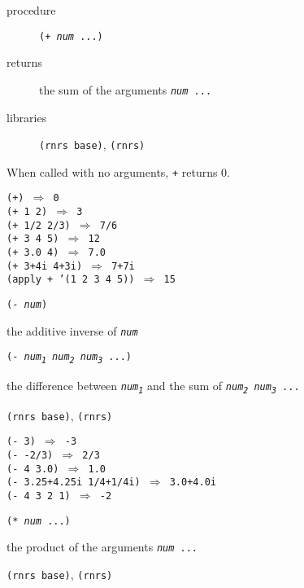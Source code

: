 \begin{description}

\label{objects_s89}\item[procedure] \texttt{(+ \textit{num} ...)}



\item[returns] the sum of the arguments \texttt{\textit{num} ...}


\item[libraries] \texttt{(rnrs base)}, \texttt{(rnrs)}
\end{description}


When called with no arguments, \texttt{+} returns 0.


\begin{alltt}
(+) \(\Rightarrow\) 0
(+ 1 2) \(\Rightarrow\) 3
(+ 1/2 2/3) \(\Rightarrow\) 7/6
(+ 3 4 5) \(\Rightarrow\) 12
(+ 3.0 4) \(\Rightarrow\) 7.0
(+ 3+4i 4+3i) \(\Rightarrow\) 7+7i
(apply + '(1 2 3 4 5)) \(\Rightarrow\) 15
\end{alltt}

\begin{description}

\label{objects_s90}\item[procedure] \texttt{(- \textit{num})}



\item[returns] the additive inverse of \texttt{\textit{num}}


\item[procedure] \texttt{(- \textit{num\textsubscript{1}} \textit{num\textsubscript{2}} \textit{num\textsubscript{3}} ...)}



\item[returns] the difference between \texttt{\textit{num\textsubscript{1}}} and the sum of \texttt{\textit{num\textsubscript{2}} \textit{num\textsubscript{3}} ...}


\item[libraries] \texttt{(rnrs base)}, \texttt{(rnrs)}
\end{description}


\begin{alltt}
(- 3) \(\Rightarrow\) -3
(- -2/3) \(\Rightarrow\) 2/3
(- 4 3.0) \(\Rightarrow\) 1.0
(- 3.25+4.25i 1/4+1/4i) \(\Rightarrow\) 3.0+4.0i
(- 4 3 2 1) \(\Rightarrow\) -2
\end{alltt}

\begin{description}

\label{objects_s91}\item[procedure] \texttt{(* \textit{num} ...)}



\item[returns] the product of the arguments \texttt{\textit{num} ...}


\item[libraries] \texttt{(rnrs base)}, \texttt{(rnrs)}
\end{description}


